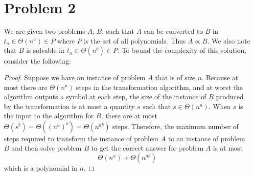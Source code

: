 \section*{Problem 2}

We are given two problems $A$, $B$, such that $A$ can be converted to $B$ in 
$t_n \in \Theta(n^a) \in P$ where $P$ is the set of all polynomials. Thus 
$A \propto B$. We also note that $B$ is solvable in $t_n \in \Theta(n^b) \in P$.
To bound the complexity of this solution, consider the following:

\begin{proof}
Suppose we have an instance of problem $A$ that is of size $n$. Because at 
most there are $\Theta(n^a)$ steps in the transformation algorithm, and at 
worst the algorithm outputs a symbol at each step, the size of the instance 
of $B$ produced by the transformation is at most a quantity $s$ such that 
$s \in \Theta(n^a)$. 
When $s$ is the input to the algorithm for $B$, there are at most 
$\Theta\left(s^b\right) = \Theta\left((n^a)^b\right) = 
\Theta\left(n^{ab}\right)$ steps. Therefore, 
the maximum number of steps required to transform the instance of problem $A$ 
to an instance of problem $B$ and then solve problem $B$ to get the correct 
answer for problem $A$ is at most
$$
\Theta(n^a) + \Theta\left(n^{ab}\right)
$$
which is a polynomial in $n$.
\end{proof}
